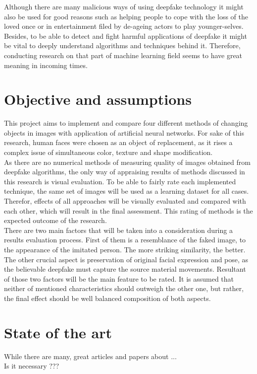 Although there are many malicious ways of using deepfake technology it might also be used for good reasons such as helping people to cope with the loss of the loved once or in entertainment filed by de-ageing actors to play younger-selves. Besides, to be able to detect and fight harmful applications of deepfake it might be vital to deeply understand algorithms  and techniques behind it. Therefore, conducting research on that part of machine learning field seems to have great meaning in incoming times.

\section{Objective and assumptions}
This project aims to implement and compare four different methods of changing objects in images with application of artificial neural networks. For sake of this research, human faces were chosen as an object of replacement, as it rises a complex issue of simultaneous color, texture and shape modification.\\

As there are no numerical methods of measuring quality of images obtained from deepfake algorithms, the only way of appraising results of methods discussed in this research is visual evaluation. To be able to fairly rate each implemented technique, the same set of images will be used as a learning dataset for all cases. Therefor, effects of all approaches will be visually evaluated and compared with each other, which will result in the final assessment. This rating of methods is the expected outcome of the research.\\

There are two main factors that will be taken into a consideration during a results evaluation process. First of them is a resemblance of the faked image, to the appearance of the imitated person. The more striking similarity, the better. The other crucial aspect is preservation of original facial expression and pose, as the believable deepfake must capture the source material movements. Resultant of those two factors will be the main feature to be rated. It is assumed that neither of mentioned characteristics should outweigh the other one, but rather, the final effect should be well balanced composition of both aspects.

\section{State of the art}
While there are many, great articles and papers about ...\\
Is it necessary ???

